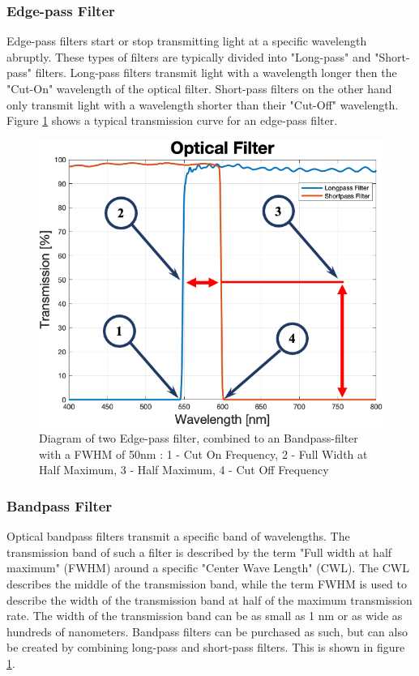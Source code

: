 \subsubsection{Edge-pass Filter}
Edge-pass filters start or stop transmitting light at a specific wavelength abruptly. These types of filters are typically divided into "Long-pass" and "Short-pass" filters. Long-pass filters transmit light with a wavelength longer then the "Cut-On" wavelength of the optical filter. Short-pass filters on the other hand only transmit light with a wavelength shorter than their "Cut-Off" wavelength. Figure \ref{longpass_diagram} shows a typical transmission curve for an edge-pass filter.  

\begin{figure}
\begin{center}
\includegraphics[width=12cm]{Pictures/Longpass.png}
\caption[Diagram of two Edge-pass filter, combined to an Bandpass-filter with a FWHM of 50nm]{Diagram of two Edge-pass filter, combined to an Bandpass-filter with a FWHM of 50nm\cite{ThorlabsEdgepass} : 1 - Cut On Frequency, 2 - Full Width at Half Maximum, 3 - Half Maximum, 4 - Cut Off Frequency}
\label{longpass_diagram}
\end{center}
\end{figure}

\subsubsection{Bandpass Filter}
Optical bandpass filters transmit a specific band of wavelengths. The transmission band of such a filter is described by the term "Full width at half maximum" (FWHM) around a specific "Center Wave Length" (CWL). The CWL describes the middle of the transmission band, while the term FWHM is used to describe the width of the transmission band at half of the maximum transmission rate. The width of the transmission band can be as small as 1 nm or as wide as hundreds of nanometers. Bandpass filters can be purchased as such, but can also be created by combining long-pass and short-pass filters. This is shown in figure \ref{longpass_diagram}.

